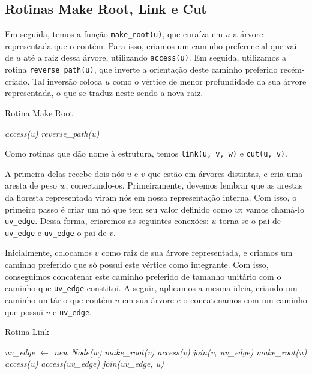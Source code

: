 \subsection{Rotinas Make Root, Link e Cut}
\label{subsection:lct-make-root}

Em seguida, temos a função \texttt{make\_root(u)}, que enraíza em $u$ a árvore representada que o contém. Para isso, criamos um caminho preferencial que vai de $u$ até a raiz dessa árvore, utilizando \texttt{access(u)}. Em seguida, utilizamos a rotina \texttt{reverse\_path(u)}, que inverte a orientação deste caminho preferido recém-criado. Tal inversão coloca $u$ como o vértice de menor profundidade da sua árvore representada, o que se traduz neste sendo a nova raiz.

\begin{algorithm}[h!]
    \caption{Rotina Make Root}\label{lct:make-root}
    \begin{algorithmic}
        \State \emph{access(u)}
        \State \emph{reverse\_path(u)}
        \EndFunction
    \end{algorithmic}
\end{algorithm}

Como rotinas que dão nome à estrutura, temos \texttt{link(u, v, w)} e \texttt{cut(u, v)}.

A primeira delas recebe dois nós $u$ e $v$ que estão em árvores distintas, e cria uma aresta de peso $w$, conectando-os. Primeiramente, devemos lembrar que as arestas da floresta representada viram nós em nossa representação interna. Com isso, o primeiro passo é criar um nó que tem seu valor definido como $w$; vamos chamá-lo \texttt{uv\_edge}. Dessa forma, criaremos as seguintes conexões: $u$ torna-se o pai de \texttt{uv\_edge} e \texttt{uv\_edge} o pai de $v$.

Inicialmente, colocamos $v$ como raiz de sua árvore representada, e criamos um caminho preferido que só possui este vértice como integrante. Com isso, conseguimos concatenar este caminho preferido de tamanho unitário com o caminho que \texttt{uv\_edge} constitui. A seguir, aplicamos a mesma ideia, criando um caminho unitário que contém $u$ em sua árvore e o concatenamos com um caminho que possui $v$ e \texttt{uv\_edge}.

\begin{algorithm}[h!]
    \caption{Rotina Link}\label{lct:link}
    \begin{algorithmic}
        \State \emph{uv\_edge $\gets$ new Node(w)} 
        \State {}
        \State \emph{make\_root(v)}
        \State \emph{access(v)}
        \State \emph{join(v, uv\_edge)}
        \State {}
        \State \emph{make\_root(u)}
        \State \emph{access(u)}
        \State \emph{access(uv\_edge)}
        \State \emph{join(uv\_edge, u)}
        \EndFunction
    \end{algorithmic}
\end{algorithm}

